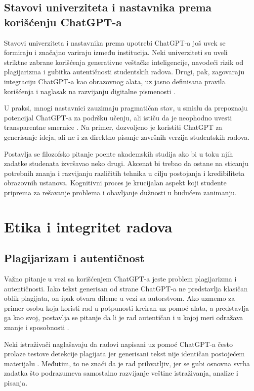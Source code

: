 \documentclass[12pt]{article}
\begin{document}
\subsection{Stavovi univerziteta i nastavnika prema korišćenju ChatGPT-a}

Stavovi univerziteta i nastavnika prema upotrebi ChatGPT-a još uvek se formiraju i značajno variraju između institucija. Neki univerziteti su uveli striktne zabrane korišćenja generativne veštačke inteligencije, navodeći rizik od plagijarizma i gubitka autentičnosti studentskih radova. Drugi, pak, zagovaraju integraciju ChatGPT-a kao obrazovnog alata, uz jasno definisana pravila korišćenja i naglasak na razvijanju digitalne pismenosti \cite{petrovska2024chatgpt}. 

U praksi, mnogi nastavnici zauzimaju pragmatičan stav, u smislu da prepoznaju potencijal ChatGPT-a za podršku učenju, ali ističu da je neophodno uvesti transparentne smernice \cite{mahapatra2024impact}. Na primer, dozvoljeno je koristiti ChatGPT za generisanje ideja, ali ne i za direktno pisanje završnih verzija studentskih radova.

Postavlja se filozofsko pitanje poente akademskih studija ako bi u toku njih zadatke studenata izvršavao neko drugi. Akcenat bi trebao da ostane na sticanju potrebnih znanja i razvijanju različitih tehnika u cilju postojanja i kredibiliteta obrazovnih ustanova. Kognitivni proces je krucijalan aspekt koji studente priprema za rešavanje problema i obavljanje dužnosti u budućem zanimanju.

\section{Etika i integritet radova}

\subsection{Plagijarizam i autentičnost}

Važno pitanje u vezi sa korišćenjem ChatGPT-a jeste problem plagijarizma i autentičnosti. Iako tekst generisan od strane ChatGPT-a ne predstavlja klasičan oblik plagijata, on ipak otvara dileme u vezi sa autorstvom. Ako uzmemo za primer osobu koja koristi rad u potpunosti kreiran uz pomoć alata, a predstavlja ga kao svoj, postavlja se pitanje da li je rad autentičan i u kojoj meri odražava znanje i sposobnosti \cite{zakova2025exploring}.

Neki istraživači naglašavaju da radovi napisani uz pomoć ChatGPT-a često prolaze testove detekcije plagijata jer generisani tekst nije identičan postojećem materijalu \cite{edwards2023chatgpt}. Međutim, to ne znači da je rad prihvatljiv, jer se gubi osnovna svrha zadatka što podrazumeva samostalno razvijanje veštine istraživanja, analize i pisanja.
\end{document}
